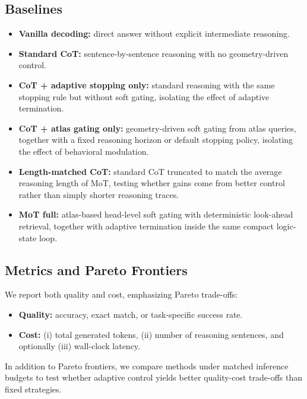 \documentclass{article}
\begin{document}
\subsection{Baselines}
\begin{itemize}[leftmargin=1.3em, itemsep=0.2em]
    \item \textbf{Vanilla decoding:} direct answer without explicit intermediate reasoning.
    \item \textbf{Standard CoT:} sentence-by-sentence reasoning with no geometry-driven control.
    \item \textbf{CoT + adaptive stopping only:} standard reasoning with the same stopping rule but without soft gating, isolating the effect of adaptive termination.
    \item \textbf{CoT + atlas gating only:} geometry-driven soft gating from atlas queries, together with a fixed reasoning horizon or default stopping policy, isolating the effect of behavioral modulation.
    \item \textbf{Length-matched CoT:} standard CoT truncated to match the average reasoning length of MoT, testing whether gains come from better control rather than simply shorter reasoning traces.
    \item \textbf{MoT full:} atlas-based head-level soft gating with deterministic look-ahead retrieval, together with adaptive termination inside the same compact logic-state loop.
\end{itemize}

\subsection{Metrics and Pareto Frontiers}
We report both quality and cost, emphasizing Pareto trade-offs:
\begin{itemize}[leftmargin=1.3em, itemsep=0.2em]
    \item \textbf{Quality:} accuracy, exact match, or task-specific success rate.
    \item \textbf{Cost:} (i) total generated tokens, (ii) number of reasoning sentences, and optionally (iii) wall-clock latency.
\end{itemize}
In addition to Pareto frontiers, we compare methods under matched inference budgets to test whether adaptive control yields better quality-cost trade-offs than fixed strategies.
\end{document}

